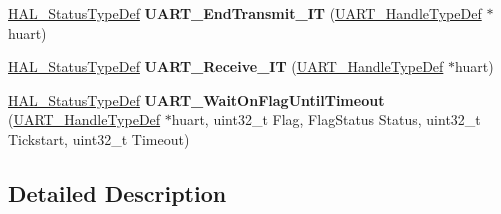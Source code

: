 \begin{DoxyCompactItemize}
\hyperlink{stm32f0xx__hal__def_8h_a63c0679d1cb8b8c684fbb0632743478f}{H\+A\+L\+\_\+\+Status\+Type\+Def} {\bfseries U\+A\+R\+T\+\_\+\+End\+Transmit\+\_\+\+IT} (\hyperlink{struct_u_a_r_t___handle_type_def}{U\+A\+R\+T\+\_\+\+Handle\+Type\+Def} $\ast$huart)
\item 
\mbox{\label{group___u_a_r_t___private___functions_ga76c17d28af976ff68ce8ef1517c1dd0d}} 
\hyperlink{stm32f0xx__hal__def_8h_a63c0679d1cb8b8c684fbb0632743478f}{H\+A\+L\+\_\+\+Status\+Type\+Def} {\bfseries U\+A\+R\+T\+\_\+\+Receive\+\_\+\+IT} (\hyperlink{struct_u_a_r_t___handle_type_def}{U\+A\+R\+T\+\_\+\+Handle\+Type\+Def} $\ast$huart)
\item 
\mbox{\label{group___u_a_r_t___private___functions_gad377d340a4703ef434289d54794c281f}} 
\hyperlink{stm32f0xx__hal__def_8h_a63c0679d1cb8b8c684fbb0632743478f}{H\+A\+L\+\_\+\+Status\+Type\+Def} {\bfseries U\+A\+R\+T\+\_\+\+Wait\+On\+Flag\+Until\+Timeout} (\hyperlink{struct_u_a_r_t___handle_type_def}{U\+A\+R\+T\+\_\+\+Handle\+Type\+Def} $\ast$huart, uint32\+\_\+t Flag, Flag\+Status Status, uint32\+\_\+t Tickstart, uint32\+\_\+t Timeout)
\end{DoxyCompactItemize}


\subsection{Detailed Description}
